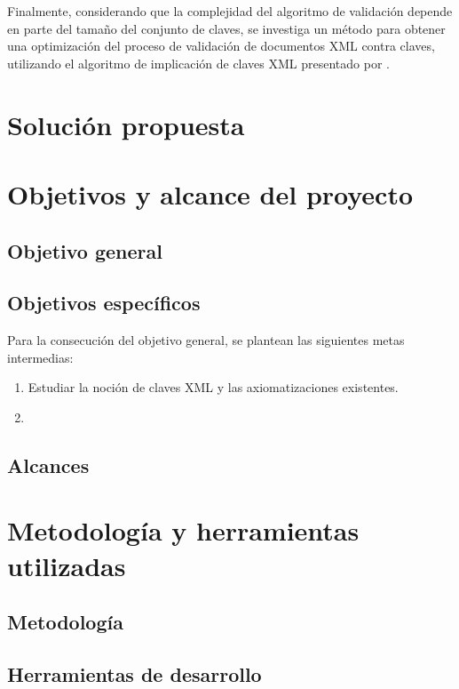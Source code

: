 Finalmente, considerando que la complejidad del algoritmo de validación depende en parte del tamaño del conjunto de claves, se investiga un método para obtener una optimización del proceso de validación de documentos XML contra claves, utilizando el algoritmo de implicación de claves XML presentado por \citet{HartmannLink:2009}.

\section{Soluci\'on propuesta}
\label{intro:solucion}


\section{Objetivos y alcance del proyecto}
\label{intro:objetivos}

\subsection{Objetivo general}


\subsection{Objetivos espec\'ificos}

Para la consecución del objetivo general, se plantean las siguientes metas intermedias:

\begin{enumerate}
  \item Estudiar la noción de claves XML y las axiomatizaciones existentes.
  \item 
\end{enumerate}

\subsection{Alcances}


\section{Metodolog\'ia y herramientas utilizadas}
\label{intro:metodologia}

\subsection{Metodolog\'ia}


\subsection{Herramientas de desarrollo}


